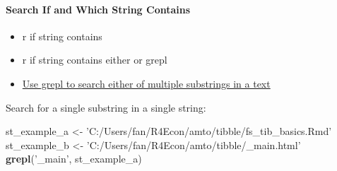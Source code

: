 \documentclass[
]{book}
\newenvironment{Shaded}{\begin{snugshade}}{\end{snugshade}}
\newcommand{\CharTok}[1]{\textcolor[rgb]{0.31,0.60,0.02}{#1}}
\newcommand{\CommentTok}[1]{\textcolor[rgb]{0.56,0.35,0.01}{\textit{#1}}}
\newcommand{\DataTypeTok}[1]{\textcolor[rgb]{0.13,0.29,0.53}{#1}}
\newcommand{\KeywordTok}[1]{\textcolor[rgb]{0.13,0.29,0.53}{\textbf{#1}}}
\newcommand{\NormalTok}[1]{#1}
\newcommand{\OperatorTok}[1]{\textcolor[rgb]{0.81,0.36,0.00}{\textbf{#1}}}
\newcommand{\StringTok}[1]{\textcolor[rgb]{0.31,0.60,0.02}{#1}}
\providecommand{\tightlist}{%
  \setlength{\itemsep}{0pt}\setlength{\parskip}{0pt}}
\begin{document}
\begin{Shaded}
\end{Shaded}

\hypertarget{search-if-and-which-string-contains}{%
\paragraph{Search If and Which String Contains}\label{search-if-and-which-string-contains}}

\begin{itemize}
\tightlist
\item
  r if string contains
\item
  r if string contains either or grepl
\item
  \href{https://stackoverflow.com/a/26319765/8280804}{Use grepl to search either of multiple substrings in a text}
\end{itemize}

Search for a single substring in a single string:

\begin{Shaded}
\begin{Highlighting}[]
\NormalTok{st_example_a <-}\StringTok{ 'C:/Users/fan/R4Econ/amto/tibble/fs_tib_basics.Rmd'}
\NormalTok{st_example_b <-}\StringTok{ 'C:/Users/fan/R4Econ/amto/tibble/_main.html'}
\KeywordTok{grepl}\NormalTok{(}\StringTok{'_main'}\NormalTok{, st_example_a)}
\end{Highlighting}
\end{Shaded}
\end{document}
